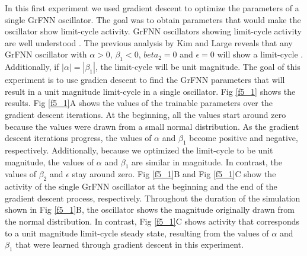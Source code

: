 \documentclass{report}
\begin{document}
In this first experiment we used gradient descent to optimize the parameters of a single GrFNN oscillator. The goal was to obtain parameters that would make the oscillator show limit-cycle activity. GrFNN oscillators showing limit-cycle activity are well understood \cite{kim2015signal}. The previous analysis by Kim and Large reveals that any GrFNN oscillator with $\alpha>0$, $\beta_1<0$, $beta_2=0$ and $\epsilon=0$ will show a limit-cycle \cite{kim2015signal}. Additionally, if $|\alpha|=|\beta_1|$, the limit-cycle will be unit magnitude. The goal of this experiment is to use gradien descent to find the GrFNN parameters that will result in a unit magnitude limit-cycle in a single oscillator. Fig \ref{f5_1} shows the results. Fig \ref{f5_1}A shows the values of the trainable parameters over the gradient descent iterations. At the beginning, all the values start around zero because the values were drawn from a small normal distribution. As the gradient descent iterations progress, the values of $\alpha$ and $\beta_1$ become positive and negative, respectively. Additionally, because we optimized the limit-cycle to be unit magnitude, the values of $\alpha$ and $\beta_1$ are similar in magnitude. In contrast, the values of $\beta_2$ and $\epsilon$ stay around zero. Fig \ref{f5_1}B and Fig \ref{f5_1}C show the activity of the single GrFNN oscillator at the beginning and the end of the gradient descent process, respectively. Throughout the duration of the simulation shown in Fig \ref{f5_1}B, the oscillator shows the magnitude originally drawn from the normal distribution. In contrast, Fig \ref{f5_1}C shows activity that corresponds to a unit magnitude limit-cycle steady state, resulting from the values of $\alpha$ and $\beta_1$ that were learned through gradient descent in this experiment. 
\end{document}
